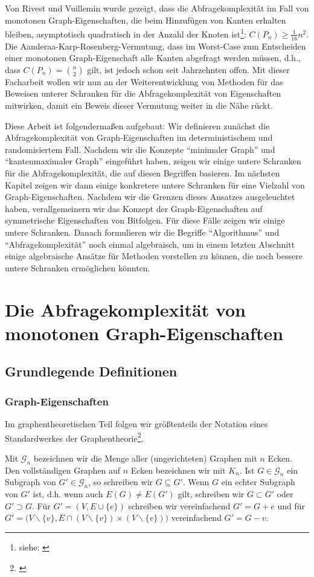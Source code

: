 \documentclass[10pt,a4paper, footheight=1mm, bibliography=totoc]{scrreprt}
\theoremstyle{definition}
\begin{document}
Von Rivest und Vuillemin wurde gezeigt,
dass die Abfragekomplexität
im Fall von monotonen Graph-Eigenschaften, die beim 
Hinzufügen von Kanten erhalten bleiben, asymptotisch
quadratisch in der Anzahl der Knoten
ist\footnote{siehe: \cite[Theorem 6]{Rivest}}: $C(P_n) \geq \frac{1}{16}n^2$.
Die Aanderaa-Karp-Rosenberg-Vermutung, dass im Worst-Case
zum Entscheiden einer monotonen Graph-Eigenschaft
alle Kanten abgefragt werden müssen, d.h., dass
$C(P_n)=\binom{n}{2}$ gilt, ist jedoch schon
seit Jahrzehnten offen. Mit dieser Facharbeit
wollen wir nun an der Weiterentwicklung von Methoden
für das Beweisen unterer
Schranken für die Abfragekomplexität
von Eigenschaften mitwirken, damit ein Beweis dieser Vermutung
weiter in die Nähe rückt.

Diese Arbeit ist folgendermaßen aufgebaut:
Wir definieren zunächst die Abfragekomplexität
von Graph-Eigenschaften im deterministischem und
randomisiertem Fall. Nachdem wir die Konzepte
"`minimaler Graph"' und "`kantenmaximaler Graph"'
eingeführt haben, zeigen wir einige untere Schranken
für die Abfragekomplexität, die auf diesen Begriffen
basieren. Im nächsten Kapitel zeigen wir dann einige
konkretere untere Schranken für eine Vielzahl von
Graph-Eigenschaften. Nachdem wir die Grenzen 
dieses Ansatzes ausgeleuchtet haben, verallgemeinern
wir das Konzept der Graph-Eigenschaften auf 
symmetrische Eigenschaften von Bitfolgen. Für
diese Fälle zeigen wir einige untere Schranken.
Danach formulieren wir die Begriffe "`Algorithmus"'
und "`Abfragekomplexität"' noch einmal algebraisch, um
in einem letzten Abschnitt
einige algebraische Ansätze für Methoden vorstellen zu
können, die noch bessere untere Schranken ermöglichen könnten.

\chapter{Die Abfragekomplexität von monotonen Graph-Eigenschaften}
\section{Grundlegende Definitionen}
\subsection{Graph-Eigenschaften}
Im graphentheoretischen Teil folgen wir größtenteils
der Notation eines Standardwerkes der Graphentheorie\footnote{\cite{diestel}}.

Mit $\mathcal{G}_n$ bezeichnen wir die Menge aller
(ungerichteten) Graphen mit $n$ Ecken.
Den vollständigen Graphen auf $n$ Ecken bezeichnen wir
mit $K_n$.
Ist $G \in \mathcal{G}_n$ ein Subgraph von $G' \in \mathcal{G}_n$,
so schreiben wir $G \subseteq G'$. Wenn $G$ ein
echter Subgraph von $G'$ ist, d.h. wenn auch $E(G) \neq E(G')$ gilt, schreiben
wir $G \subset G'$ oder $G' \supset G$.
Für $G' = (V, E \cup \{e\})$ schreiben wir vereinfachend
$G' = G + e$ und für 
$G' = \big(V \backslash \{v\}, E\cap(V \backslash \{v\})\times (V \backslash \{v\})\big)$ vereinfachend $G' = G - v$.
\end{document}
